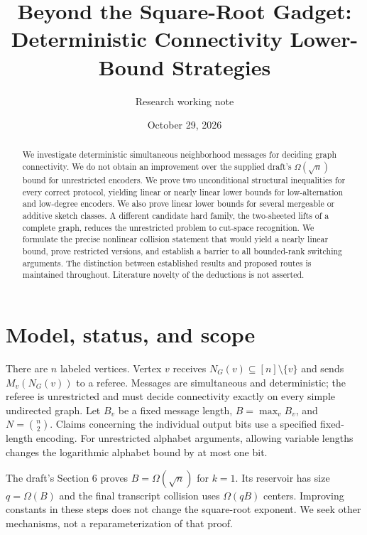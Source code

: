 \documentclass[11pt]{article}
\title{Beyond the Square-Root Gadget:\\Deterministic Connectivity Lower-Bound Strategies}
\author{Research working note}
\date{October 29, 2026}
\theoremstyle{definition}\newtheorem{definition}[theorem]{Definition}
\theoremstyle{remark}\newtheorem{remark}[theorem]{Remark}
\begin{document}
\maketitle
\begin{abstract}
We investigate deterministic simultaneous neighborhood messages for deciding graph connectivity. We do not obtain an improvement over the supplied draft's $\Omega(\sqrt n)$ bound for unrestricted encoders. We prove two unconditional structural inequalities for every correct protocol, yielding linear or nearly linear lower bounds for low-alternation and low-degree encoders. We also prove linear lower bounds for several mergeable or additive sketch classes. A different candidate hard family, the two-sheeted lifts of a complete graph, reduces the unrestricted problem to cut-space recognition. We formulate the precise nonlinear collision statement that would yield a nearly linear bound, prove restricted versions, and establish a barrier to all bounded-rank switching arguments. The distinction between established results and proposed routes is maintained throughout. Literature novelty of the deductions is not asserted.
\end{abstract}

\section{Model, status, and scope}
There are $n$ labeled vertices. Vertex $v$ receives $N_G(v)\subseteq[n]\setminus\{v\}$ and sends $M_v(N_G(v))$ to a referee. Messages are simultaneous and deterministic; the referee is unrestricted and must decide connectivity exactly on every simple undirected graph. Let $B_v$ be a fixed message length, $B=\max_v B_v$, and $N=\binom n2$. Claims concerning the individual output bits use a specified fixed-length encoding. For unrestricted alphabet arguments, allowing variable lengths changes the logarithmic alphabet bound by at most one bit.

The draft's Section 6 proves $B=\Omega(\sqrt n)$ for $k=1$. Its reservoir has size $q=\Omega(B)$ and the final transcript collision uses $\Omega(qB)$ centers. Improving constants in these steps does not change the square-root exponent. We seek other mechanisms, not a reparameterization of that proof.
\end{document}
